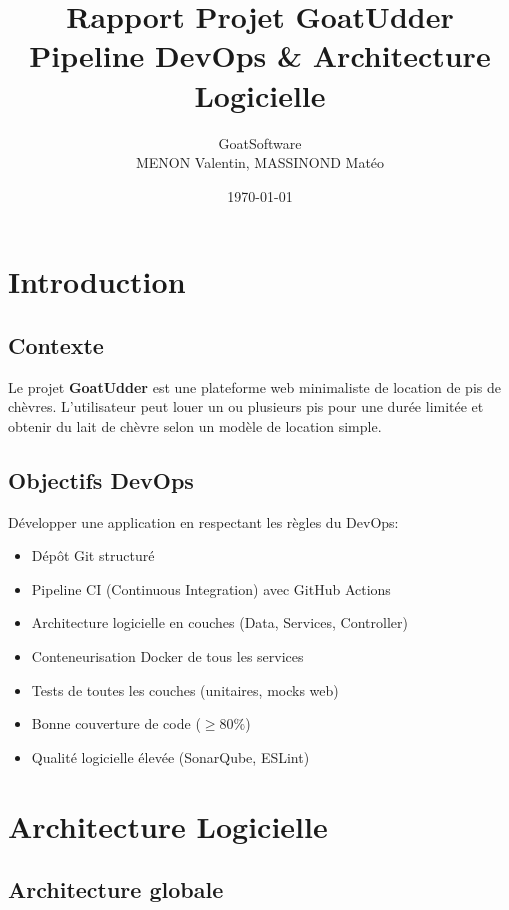 \documentclass[12pt,a4paper]{report}
\title{Rapport Projet \textbf{GoatUdder} \\ Pipeline DevOps \& Architecture Logicielle}
\author{GoatSoftware\\MENON Valentin, MASSINOND Matéo}
\date{\today}
\begin{document}
\maketitle

\tableofcontents

\chapter{Introduction}

\section{Contexte}

Le projet \textbf{GoatUdder} est une plateforme web minimaliste de location de
pis de chèvres. L'utilisateur peut louer un ou plusieurs pis pour une durée
limitée et obtenir du lait de chèvre selon un modèle de location simple.

\section{Objectifs DevOps}

Développer une application en respectant les règles du DevOps:
\begin{itemize}[leftmargin=*]
    \item Dépôt Git structuré
    \item Pipeline CI (Continuous Integration) avec GitHub Actions
    \item Architecture logicielle en couches (Data, Services, Controller)
    \item Conteneurisation Docker de tous les services
    \item Tests de toutes les couches (unitaires, mocks web)
    \item Bonne couverture de code ($\geq 80\%$)
    \item Qualité logicielle élevée (SonarQube, ESLint)
\end{itemize}

\chapter{Architecture Logicielle}

\section{Architecture globale}
\end{document}
